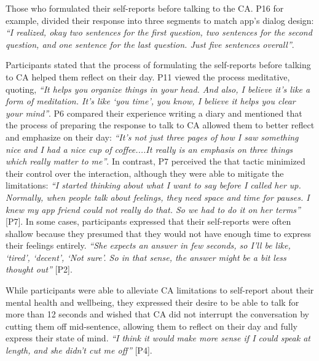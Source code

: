             Those who formulated their self-reports before talking to the \ac{CA}. P16 for example, divided their response into three segments to match \acl{app}'s dialog design:  
                \textit{``I realized, okay two sentences for the first question, two sentences for the second question, and one sentence for the last question. Just five sentences overall''}.
            
            Participants stated that the process of formulating the self-reports before talking to \ac{CA} helped them reflect on their day. P11 viewed the process meditative, quoting, 
            \textit{``It helps you organize things in your head. And also, I believe it's like a form of meditation. It's like `you time', you know, I believe it helps you clear your mind''}.
            P6 compared their experience writing a diary and mentioned that the process of preparing the response to talk to \ac{CA} allowed them to better reflect and emphasize on their day: 
                \textit{``It's not just three pages of how I saw something nice and I had a nice cup of coffee....It really is an emphasis on three things which really matter to me''}.
            In contrast, P7 perceived the that tactic minimized their control over the interaction, although they were able to mitigate the limitations:
                \textit{``I started thinking about what I want to say before I called her up. Normally, when people talk about feelings, they need space and time for pauses. I knew my \acl{app} friend could not really do that. So we had to do it on her terms''} [P7].
            In some cases, participants expressed that their self-reports were often shallow because they presumed that they would not have enough time to express their feelings entirely.
                \textit{``She expects an answer in few seconds, so I'll be like, `tired', `decent', `Not sure'. So in that sense, the answer might be a bit less thought out''} [P2].   
            
            While participants were able to alleviate \ac{CA} limitations to self-report about their mental health and wellbeing, they expressed their desire to be able to talk for more than 12 seconds and wished that \ac{CA} did not interrupt the conversation by cutting them off mid-sentence, allowing them to reflect on their day and fully express their state of mind.        
                \textit{``I think it would make more sense if I could speak at length, and she didn't cut me off''} [P4].


